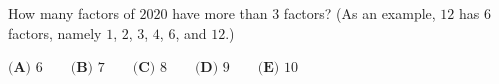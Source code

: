 How many factors of $2020$ have more than $3$ factors? (As an example, $12$ has $6$ factors, namely $1$, $2$, $3$, $4$, $6$, and $12$.)

$\textbf{(A) }6 \qquad \textbf{(B) }7 \qquad \textbf{(C) }8 \qquad \textbf{(D) }9 \qquad \textbf{(E) }10$

